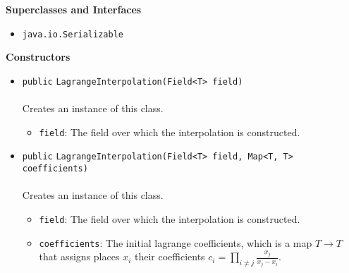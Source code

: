 \textbf{\sffamily Superclasses and Interfaces}
\begin{itemize}
\item \lstinline|java.io.Serializable|
\end{itemize}


\textbf{\sffamily Constructors}
\begin{itemize}
\item \lstinline|public| \lstinline|LagrangeInterpolation|\lstinline|(Field<T> field)|\\ \\[-0.6em]
Creates an instance of this class.
\begin{itemize}
\item \lstinline|field|: The field over which the interpolation is constructed.
\end{itemize}



\item \lstinline|public| \lstinline|LagrangeInterpolation|\lstinline|(Field<T> field, Map<T, T> coefficients)|\\ \\[-0.6em]
Creates an instance of this class.
\begin{itemize}
\item \lstinline|field|: The field over which the interpolation is constructed.
\item \lstinline|coefficients|: The initial lagrange coefficients, which is a map
 $T \to T$ that assigns places $x_i$ their coefficients
 $c_i = \prod_{i \neq j} \frac{x_j}{x_j - x_i}$.
\end{itemize}



\end{itemize}


